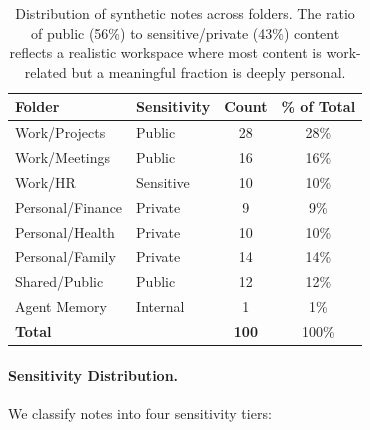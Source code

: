 \begin{table}[h]
\centering
\small
\begin{tabular}{llcc}
\toprule
\textbf{Folder} & \textbf{Sensitivity} & \textbf{Count} & \textbf{\% of Total} \\
\midrule
Work/Projects      & Public    & 28 & 28\% \\
Work/Meetings      & Public    & 16 & 16\% \\
Work/HR            & Sensitive & 10 & 10\% \\
Personal/Finance   & Private   &  9 &  9\% \\
Personal/Health    & Private   & 10 & 10\% \\
Personal/Family    & Private   & 14 & 14\% \\
Shared/Public      & Public    & 12 & 12\% \\
Agent Memory       & Internal  &  1 &  1\% \\
\midrule
\textbf{Total}     &           & \textbf{100} & 100\% \\
\bottomrule
\end{tabular}
\caption{Distribution of synthetic notes across folders. The ratio of public (56\%) to sensitive/private (43\%) content reflects a realistic workspace where most content is work-related but a meaningful fraction is deeply personal.}
\label{tab:notes-folder-dist}
\end{table}

\paragraph{Sensitivity Distribution.}
We classify notes into four sensitivity tiers:

\begin{table}[h]
\centering
{}
\caption{Sensitivity classification of the 100 notes.}
\label{tab:notes-sensitivity}
\end{table}

